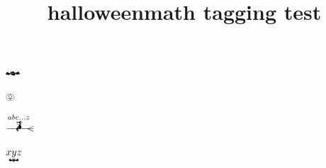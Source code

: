 \documentclass{article}
\title{halloweenmath tagging test}
\begin{document}
$\mathleftbat$

$\pumpkin$

$\xleftwitchonbroom{abc\dots z}$

$\underbat{xyz}$
\end{document}
